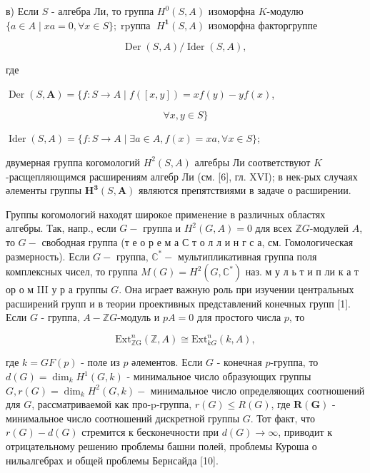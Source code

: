 \documentclass[10pt]{article}
\begin{document}
в) Если $S$ - алгебра Ли, то группа $H^{0}(S, A)$ изоморфна $K$-модулю $\{a \in A \mid x a=0, \forall x \in S\} ; \operatorname{rpуппа~} H^{\mathbf{1}}(S, A)$ изоморфна факторгруппе



\[

\operatorname{Der}(S, A) / \operatorname{Ider}(S, A) \text {, }

\]



где



$\operatorname{Der}(S, \boldsymbol{A})=\{f: S \longrightarrow A \mid f([x, y])=x f(y)-y f(x)$,



\[

\forall x, y \in S\}

\]



$\operatorname{Ider}(S, A)=\{f: S \longrightarrow A \mid \exists a \in A, f(x)=x a, \forall x \in S\}$;



двумерная группа когомологий $H^{2}(S, A)$ алгебры Ли соответствуют $K$-расщепляющимся расширениям алгебр Ли (см. [6], гл. XVI); в нек-рых случаях әлементы группы $\boldsymbol{H}^{\mathbf{3}}(S, \boldsymbol{A})$ являются препятствиями в задаче о расширении.



Группы когомологий находят широкое применение в различных областях алгебры. Так, напр., если $G-$ группа и $H^{2}(G, A)=0$ для всех $\mathbb{Z} G$-модулей $A$, то $G-$ свободная группа (т е о р е м а С т о л л и н г с а, см. Гомологическая размерность). Если $G-$ группа, $\mathbb{C}^{*}-$ мультипликативная группа поля комплексных чисел, то группа $M(G)=H^{2}\left(G, \mathbb{C}^{*}\right)$ наз. м у л ь т и п ли к а т ор о м III у р а группы $G$. Она играет важную роль при изучении центральных расширений групп и в теории проективных представлений конечных групп [1]. Если $G$ - группа, $A-\mathbb{Z} G$-модуль и $p A=0$ для простого числа $p$, то



\[

\mathrm{Ext}_{\mathbb{Z} \mathrm{G}}^{n}(\mathbb{Z}, A) \cong \mathrm{Ext}_{k G}^{n}(k, A),

\]



где $k=G F(p)$ - поле из $p$ әлементов. Если $G$ - конечная $p$-группа, то $d(G)=\operatorname{dim}_{k} H^{1}(G, k)$ - минимальное число образующих группы $G, r(G)=\operatorname{dim}_{k} H^{2}(G, k)-$ минимальное число определяющих соотношений для $G$, рассматриваемой как про-p-группа, $r(G) \leqslant R(G)$, где $\boldsymbol{R}(\boldsymbol{G})$ - минимальное число соотношений дискретной группы $G$. Тот факт, что $r(G)-d(G)$ стремится к бесконечности при $d(G) \rightarrow \infty$, приводит к отрицательному решению проблемы башни полей, проблемы Куроша о нильалгебрах и общей проблемы Бернсайда [10].
\end{document}
